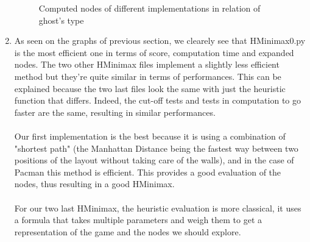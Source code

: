\documentclass{article}
\begin{document}
\begin{enumerate}[label=\alph*.,leftmargin=*]
\begin{figure}[!h]
        \caption{Computed nodes of different implementations in relation of ghost's type}  
    \end{figure}
    \newpage
    \item As seen on the graphs of previous section, we clearely see that HMinimax0.py is the most efficient one in terms of score, computation time and expanded nodes.
    The two other HMinimax files implement a slightly less efficient method but they're quite similar in terms of performances. This can be explained because the two last files
    look the same with just the heuristic function that differs. Indeed, the cut-off tests and tests in computation to go faster are the same, resulting in similar performances.
    \\\\
    Our first implementation is the best because it is using a combination of "shortest path" (the Manhattan Distance being the fastest way between two positions of the layout without taking care of the walls), and in the case
     of Pacman this method is efficient.
    This provides a good evaluation of the nodes, thus resulting in a good HMinimax.
    \\\\
    For our two last HMinimax, the heuristic evaluation is more classical, it uses a formula that takes multiple parameters and weigh them to get a representation of the game and the nodes we should explore.

\end{enumerate}



\end{document}
